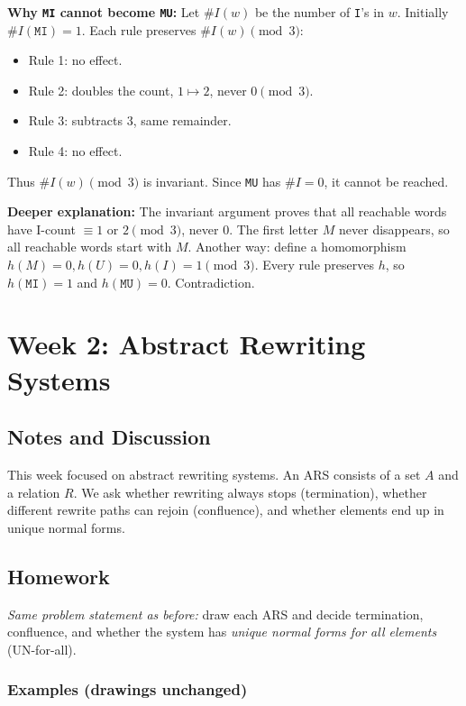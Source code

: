 \documentclass{article}
\theoremstyle{theorem}
\theoremstyle{definition}
\theoremstyle{remark}
\begin{document}
\textbf{Why \texttt{MI} cannot become \texttt{MU}:}  
Let $\#I(w)$ be the number of \texttt{I}'s in $w$. Initially $\#I(\texttt{MI})=1$. 
Each rule preserves $\#I(w) \pmod{3}$:
\begin{itemize}
  \item Rule 1: no effect.
  \item Rule 2: doubles the count, $1 \mapsto 2$, never $0 \pmod 3$.
  \item Rule 3: subtracts 3, same remainder.
  \item Rule 4: no effect.
\end{itemize}
Thus $\#I(w) \pmod{3}$ is invariant. Since \texttt{MU} has $\#I=0$, it cannot be reached.

\textbf{Deeper explanation:}  
The invariant argument proves that all reachable words have I-count $\equiv 1$ or $2 \pmod{3}$, never 0.  
The first letter $M$ never disappears, so all reachable words start with $M$.  
Another way: define a homomorphism $h(M)=0, h(U)=0, h(I)=1 \pmod 3$. 
Every rule preserves $h$, so $h(\texttt{MI})=1$ and $h(\texttt{MU})=0$. Contradiction.  

\section{Week 2: Abstract Rewriting Systems}

\subsection{Notes and Discussion}
This week focused on abstract rewriting systems. 
An ARS consists of a set $A$ and a relation $R$. 
We ask whether rewriting always stops (termination), whether different rewrite paths can rejoin (confluence), and whether elements end up in unique normal forms.

\subsection{Homework}
\emph{Same problem statement as before:} draw each ARS and decide termination, confluence, and whether the system has \emph{unique normal forms for all elements} (UN-for-all).

\subsubsection*{Examples (drawings unchanged)}
\begin{tikzpicture}
\end{tikzpicture}
\end{document}
